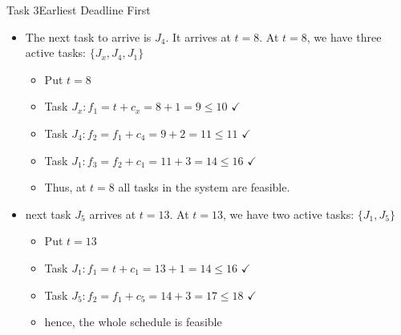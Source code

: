 \begin{frame}[allowframebreaks]{Task 3}{Earliest Deadline First\vspace{0.5cm}}
\begin{itemize}
\begin{itemize}
      \item $t=3$
      \item Task $J_3: f_1=t+c_3=3+4=7 \leq 8$ $\checkmark$
      \item Task $J_x: f_2=f_1+c_x=7+2=9 \leq 10$ $\checkmark$
      \item Task $J_1: f_3=f_2+c_1=9+3=12 \leq 16$ $\checkmark$
      \item Thus, at $t=3$ \alert{all} tasks in the system are feasible
    \end{itemize}
\item The next task to arrive is $J_4$. It arrives at $t=8$. At $t=8$, we have three active tasks: $\{J_x, J_4, J_1\}$
  \begin{itemize}
    \item Put $t=8$
    \item Task $J_x: f_1=t+c_x=8+1=9 \leq 10$ $\checkmark$
    \item Task $J_4: f_2=f_1+c_4=9+2=11 \leq 11$ $\checkmark$
    \item Task $J_1: f_3=f_2+c_1=11+3=14 \leq 16$ $\checkmark$
    \item Thus, at $t=8$ \alert{all} tasks in the system are feasible.
  \end{itemize}
\item next task $J_5$ arrives at $t=13$. At $t=13$, we have two active tasks: $\{J_1, J_5\}$
    \begin{itemize}
      \item Put $t=13$
      \item Task $J_1: f_1=t+c_1=13+1=14 \leq 16$ $\checkmark$
      \item Task $J_5: f_2=f_1+c_5=14+3=17 \leq 18$ $\checkmark$
      \item hence, the whole \alert{schedule is feasible}
    \end{itemize}
  \end{itemize}
\end{frame}

